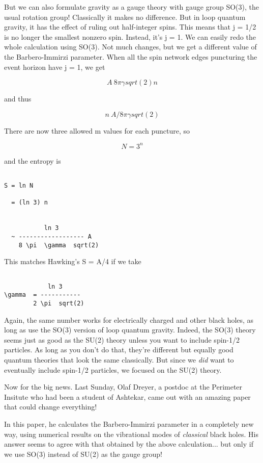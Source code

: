 But we can also formulate gravity as a gauge theory with gauge group
SO(3), the usual rotation group!  Classically it makes no difference.
But in loop quantum gravity, it has the effect of ruling out
half-integer spins.  This means that j = 1/2 is no longer the smallest
nonzero spin.  Instead, it's j = 1.  We can easily redo the whole
calculation using SO(3).  Not much changes, but we get a different value
of the Barbero-Immirzi parameter.  When all the spin network edges
puncturing the event horizon have j = 1, we get


$$

A ~ 8 \pi  \gamma  sqrt(2) n 
$$
    
and thus


$$

n ~ A / 8 \pi  \gamma  sqrt(2)
$$
    
There are now three allowed m values for each puncture, so


$$

N = 3^{n}
$$
    
and the entropy is


\begin{verbatim}

S = ln N

  = (ln 3) n


           ln 3
  ~ ------------------ A
    8 \pi  \gamma  sqrt(2)      
\end{verbatim}
    
This matches Hawking's S = A/4 if we take


\begin{verbatim}

            ln 3
\gamma  = -----------
        2 \pi  sqrt(2)
\end{verbatim}
    
Again, the same number works for electrically charged and other black
holes, as long as use the SO(3) version of loop quantum gravity.
Indeed, the SO(3) theory seems just as good as the SU(2) theory unless
you want to include spin-1/2 particles.  As long as you don't do that,
they're different but equally good quantum theories that look the same
classically.  But since we \emph{did} want to eventually include spin-1/2
particles, we focused on the SU(2) theory.

Now for the big news.  Last Sunday, Olaf Dreyer, a postdoc at the
Perimeter Insitute who had been a student of Ashtekar, came out with an
amazing paper that could change everything!

In this paper, he calculates the Barbero-Immirzi parameter in a
completely new way, using numerical results on the vibrational modes of
\emph{classical} black holes.  His answer seems to agree with that obtained
by the above calculation...  but only if we use SO(3) instead of SU(2)
as the gauge group!

